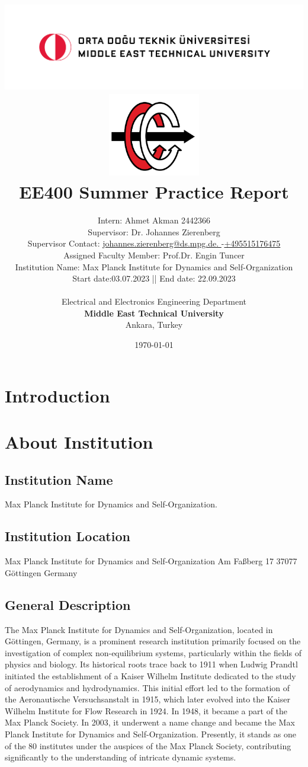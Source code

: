 \documentclass[letterpaper,12pt]{article}
\title{
\includegraphics[width=17cm]{odtu.png} \\
\includegraphics[width=4cm]{eee.png} \\
\vspace*{0.5in}
\textbf{EE400 Summer Practice Report}
\vspace*{0.25in}
}
\author{Intern: Ahmet Akman 2442366\\
Supervisor: Dr. Johannes Zierenberg\\
Supervisor Contact: \href{mailto: johannes.zierenberg@ds.mpg.de}{ johannes.zierenberg@ds.mpg.de. }-\href{tel:+495515176475}{+495515176475}\\
Assigned Faculty Member: Prof.Dr. Engin Tuncer\\
Institution Name: Max Planck Institute for Dynamics and Self-Organization\\
Start date:03.07.2023 || End date: 22.09.2023\\
        \vspace*{0.25in} \\
        Electrical and Electronics Engineering Department\\
        \textbf{Middle East Technical University}\\
        Ankara, Turkey
       } \date{\today}
\begin{document}


%


\maketitle

\newpage
\tableofcontents
\newpage
\section{Introduction}
\section{About Institution}
\subsection{Institution Name}
Max Planck Institute for Dynamics and Self-Organization.
\subsection{Institution Location}
Max Planck Institute for Dynamics and Self-Organization
Am Faßberg 17
37077 Göttingen
Germany
\subsection{General Description}
The Max Planck Institute for Dynamics and Self-Organization, located in Göttingen, Germany, is a prominent research institution primarily focused on the investigation of complex non-equilibrium systems, particularly within the fields of physics and biology. Its historical roots trace back to 1911 when Ludwig Prandtl initiated the establishment of a Kaiser Wilhelm Institute dedicated to the study of aerodynamics and hydrodynamics. This initial effort led to the formation of the Aeronautische Versuchsanstalt in 1915, which later evolved into the Kaiser Wilhelm Institute for Flow Research in 1924. In 1948, it became a part of the Max Planck Society. In 2003, it underwent a name change and became the Max Planck Institute for Dynamics and Self-Organization. Presently, it stands as one of the 80 institutes under the auspices of the Max Planck Society, contributing significantly to the understanding of intricate dynamic systems.
\end{document}
